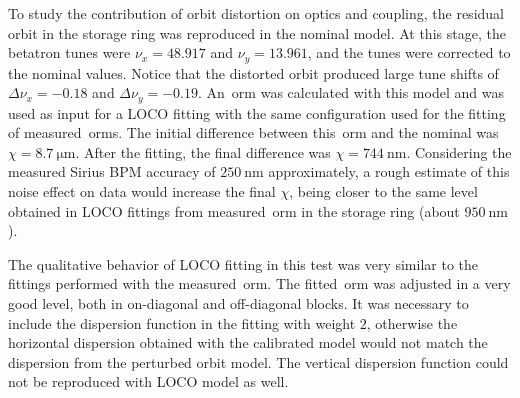 To study the contribution of orbit distortion on optics and coupling, the residual orbit in the storage ring was reproduced in the nominal model. At this stage, the betatron tunes were $\nu_x = 48.917$ and $\nu_y = 13.961$, and the tunes were corrected to the nominal values. Notice that the distorted orbit produced large tune shifts of $\Delta \nu_x = -0.18$ and $\Delta \nu_y = -0.19$. An~\gls{orm} was calculated with this model and was used as input for a LOCO fitting with the same configuration used for the fitting of measured~\gls{orm}s. The initial difference between this~\gls{orm} and the nominal was $\chi = \SI{8.7}{\micro\meter}$. After the fitting, the final difference was $\chi = \SI{744}{\nano\meter}$. Considering the measured Sirius BPM accuracy of $\SI{250}{\nano\meter}$ approximately, a rough estimate of this noise effect on data would increase the final $\chi$, being closer to the same level obtained in LOCO fittings from measured~\gls{orm} in the storage ring (about $\SI{950}{\nano\meter}$).

The qualitative behavior of LOCO fitting in this test was very similar to the fittings performed with the measured~\gls{orm}. The fitted~\gls{orm} was adjusted in a very good level, both in on-diagonal and off-diagonal blocks. It was necessary to include the dispersion function in the fitting with weight $2$, otherwise the horizontal dispersion obtained with the calibrated model would not match the dispersion from the perturbed orbit model. The vertical dispersion function could not be reproduced with LOCO model as well. 

